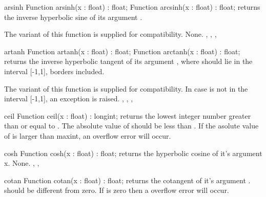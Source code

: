 
\begin{function}{arsinh}
\Declaration
Function arsinh(x : float) : float;
Function arcsinh(x : float) : float;
\Description
{} returns the inverse hyperbolic sine of its argument . 

The  variant of this function is supplied for \delphi 
compatibility.
\Errors
None.
\SeeAlso
{}, , , 
\end{function}



\begin{function}{artanh}
\Declaration
Function artanh(x : float) : float;
Function arctanh(x : float) : float;
\Description
{} returns the inverse hyperbolic tangent of its argument ,
where  should lie in the interval [-1,1], borders included.

The  variant of this function is supplied for \delphi compatibility.
\Errors
In case  is not in the interval [-1,1], an 
exception is raised.
\SeeAlso
{}, , , 
\Errors
\SeeAlso
\end{function}



\begin{function}{ceil}
\Declaration
Function ceil(x : float) : longint;
\Description
{} returns the lowest integer number greater than or equal to .
The absolute value of  should be less than .
\Errors
If the asolute value of  is larger than maxint, an overflow error will
occur.
\SeeAlso
{}
\end{function}


\begin{function}{cosh}
\Declaration
Function cosh(x : float) : float;
\Description
{} returns the hyperbolic cosine of it's argument {x}.
\Errors
None.
\SeeAlso
{}, , 
\end{function}



\begin{function}{cotan}
\Declaration
Function cotan(x : float) : float;
\Description
{} returns the cotangent of it's argument .  should
be different from zero.
\Errors
If  is zero then a overflow error will occur.
\SeeAlso
{}
\end{function}

